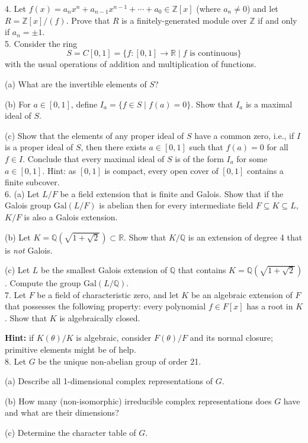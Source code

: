 \documentclass[11pt]{article}
\newcommand{\Z}{\mathbb{Z}}
\newcommand{\Q}{\mathbb{Q}}
\newcommand{\R}{\mathbb{R}}
\begin{document}
4. Let $f(x) = a_nx^n + a_{n-1}x^{n-1}+\cdots+a_0\in \Z[x]$ (where $a_n\neq 0$) and let $R = \Z[x]/(f)$. Prove that $R$ is a finitely-generated module over $\Z$ if and only if $a_n = \pm 1$. \\

5. Consider the ring \[
S = C[0,1] = \{f:[0,1]\to \R \mid \text{$f$ is continuous}\}
\]
with the usual operations of addition and multiplication of functions.

(a) What are the invertible elements of $S$?

(b) For $a\in [0,1]$, define $I_a = \{f\in S\mid f(a) = 0\}$. Show that $I_a$ is a maximal ideal of $S$. 

(c) Show that the elements of any proper ideal of $S$ have a common zero, i.e., if $I$ is
a proper ideal of $S$, then there exists $a\in [0, 1]$ such that $f(a) = 0$ for all $f \in I$.
Conclude that every maximal ideal of $S$ is of the form $I_a$ for some $a \in[0, 1]$.
Hint: as $[0, 1]$ is compact, every open cover of $[0, 1]$ contains a finite subcover.\\

6. (a) Let $L/F$ be a field extension that is finite and Galois. Show that if the Galois
group $\mbox{Gal}(L/F)$ is abelian then for every intermediate field $F\subseteq  K \subseteq L$, $K/F$ is
also a Galois extension.

(b) Let $K = \Q(\sqrt{1+\sqrt{2}}) \subset \R$. Show that $K/\Q$ is an extension of degree 4 that is \emph{not} Galois.

(c) Let $L$ be the smallest Galois extension of $\Q$ that contains $K = \Q(\sqrt{1+\sqrt{2}})$. Compute the group $\mbox{Gal}(L/\Q)$. \\

7. Let $F$ be a field of characteristic zero, and let $K$ be an algebraic extension of $F$ that
possesses the following property: every polynomial $f \in F[x]$ has a root in $K$. Show
that $K$ is algebraically closed.

\textbf{Hint:} if $K(\theta)/K$ is algebraic, consider $F(\theta)/F$ and its normal closure; primitive elements
might be of help.\\

8. Let $G$ be the unique non-abelian group of order 21.

(a) Describe all 1-dimensional complex representations of $G$.

(b) How many (non-isomorphic) irreducible complex representations does $G$ have and
what are their dimensions?

(c) Determine the character table of $G$.
\end{document}
